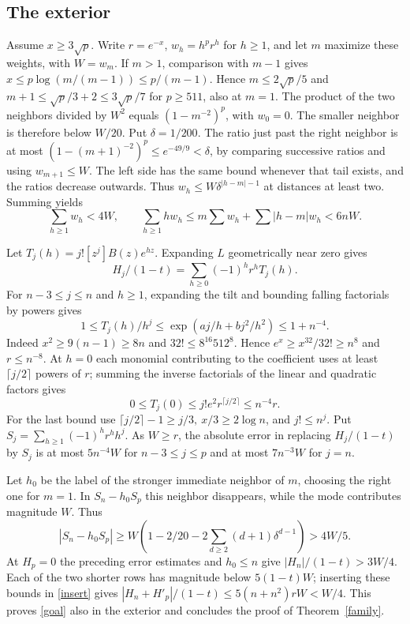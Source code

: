 \subsection{The exterior}
Assume \(x\ge3\sqrt p\). Write \(r=e^{-x}\), \(w_h=h^p r^h\) for \(h\ge1\), and let \(m\) maximize these weights, with \(W=w_m\). If \(m>1\), comparison with \(m-1\) gives \(x\le p\log(m/(m-1))\le p/(m-1)\). Hence \(m\le2\sqrt p/5\) and \(m+1\le \sqrt p/3+2\le3\sqrt p/7\) for \(p\ge511\), also at \(m=1\). The product of the two neighbors divided by \(W^2\) equals \((1-m^{-2})^p\), with \(w_0=0\). The smaller neighbor is therefore below \(W/20\). Put \(\delta=1/200\). The ratio just past the right neighbor is at most \((1-(m+1)^{-2})^p\le e^{-49/9}<\delta\), by comparing successive ratios and using \(w_{m+1}\le W\). The left side has the same bound whenever that tail exists, and the ratios decrease outwards. Thus \(w_h\le W\delta^{|h-m|-1}\) at distances at least two. Summing yields
\[
 \sum_{h\ge1} w_h<4W,\qquad
 \sum_{h\ge1} h w_h\le m\sum w_h+\sum |h-m|w_h<6nW.
\]

Let \(T_j(h)=j![z^j]B(z)e^{hz}\). Expanding \(L\) geometrically near zero gives
\[
 H_j/(1-t)=\sum_{h\ge0}(-1)^h r^hT_j(h).
\]
For \(n-3\le j\le n\) and \(h\ge1\), expanding the tilt and bounding falling factorials by powers gives
\[
 1\le T_j(h)/h^j\le \exp(aj/h+bj^2/h^2)\le1+n^{-4}.
\]
Indeed \(x^2\ge9(n-1)\ge8n\) and \(32!\le8^{16}512^8\). Hence \(e^x\ge x^{32}/32!\ge n^8\) and \(r\le n^{-8}\). At \(h=0\) each monomial contributing to the coefficient uses at least \(\lceil j/2\rceil\) powers of \(r\); summing the inverse factorials of the linear and quadratic factors gives
\[
 0\le T_j(0)\le j!e^2 r^{\lceil j/2\rceil}\le n^{-4}r .
\]
For the last bound use \(\lceil j/2\rceil-1\ge j/3,\ x/3\ge2\log n\), and \(j!\le n^j\).
Put \(S_j=\sum_{h\ge1}(-1)^h r^hh^j\). As \(W\ge r\), the absolute error in replacing \(H_j/(1-t)\) by \(S_j\) is at most \(5n^{-4}W\) for \(n-3\le j\le p\) and at most \(7n^{-3}W\) for \(j=n\).

Let \(h_0\) be the label of the stronger immediate neighbor of \(m\), choosing the right one for \(m=1\). In \(S_n-h_0 S_p\) this neighbor disappears, while the mode contributes magnitude \(W\). Thus
\[
 |S_n-h_0 S_p|\ge W\left(1-2/20-2\sum_{d\ge2}(d+1)\delta^{d-1}\right)>4W/5 .
\]
At \(H_p=0\) the preceding error estimates and \(h_0\le n\) give \(|H_n|/(1-t)>3W/4\). Each of the two shorter rows has magnitude below \(5(1-t)W\); inserting these bounds in \eqref{insert} gives \(|H_n+H'_p|/(1-t)\le5(n+n^2)rW<W/4\). This proves \eqref{goal} also in the exterior and concludes the proof of Theorem~\ref{family}.
